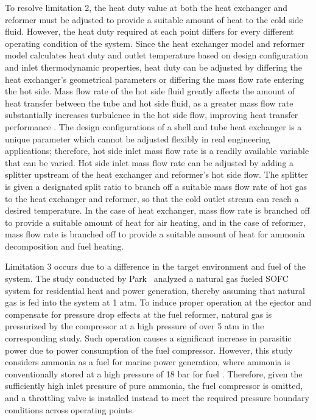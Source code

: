 \documentclass[a4paper,10pt]{cas-dc} %
\begin{document}
To resolve limitation 2, the heat duty value at both the heat exchanger and reformer must be adjusted to provide a suitable amount of heat to the cold side fluid.
However, the heat duty required at each point differs for every different operating condition of the system.
Since the heat exchanger model and reformer model calculates heat duty and outlet temperature based on design configuration and inlet thermodynamic properties, heat duty can be adjusted by differing the heat exchanger's geometrical parameters or differing the mass flow rate entering the hot side.
Mass flow rate of the hot side fluid greatly affects the amount of heat transfer between the tube and hot side fluid, as a greater mass flow rate substantially increases turbulence in the hot side flow, improving heat transfer performance \cite{OZDEN20101004}.
The design configurations of a shell and tube heat exchanger is a unique parameter which cannot be adjusted flexibly in real engineering applications; therefore, hot side inlet mass flow rate is a readily available variable that can be varied.
Hot side inlet mass flow rate can be adjusted by adding a splitter upstream of the heat exchanger and reformer's hot side flow.
The splitter is given a designated split ratio to branch off a suitable mass flow rate of hot gas to the heat exchanger and reformer, so that the cold outlet stream can reach a desired temperature.
In the case of heat exchanger, mass flow rate is branched off to provide a suitable amount of heat for air heating, and in the case of reformer, mass flow rate is branched off to provide a suitable amount of heat for ammonia decomposition and fuel heating.

Limitation 3 occurs due to a difference in the target environment and fuel of the system.
The study conducted by Park~\cite{PARK2023232970} analyzed a natural gas fueled SOFC system for residential heat and power generation, thereby assuming that natural gas is fed into the system at 1 atm.
To induce proper operation at the ejector and compensate for pressure drop effects at the fuel reformer, natural gas is pressurized by the compressor at a high pressure of over 5 atm in the corresponding study.
Such operation causes a significant increase in parasitic power due to power consumption of the fuel compressor.
However, this study considers ammonia as a fuel for marine power generation, where ammonia is conventionally stored at a high pressure of 18 bar for fuel \cite{DNV2023AmmoniaMarineFuelHandbook}.
Therefore, given the sufficiently high inlet pressure of pure ammonia, the fuel compressor is omitted, and a throttling valve is installed instead to meet the required pressure boundary conditions across operating points.
\end{document}
